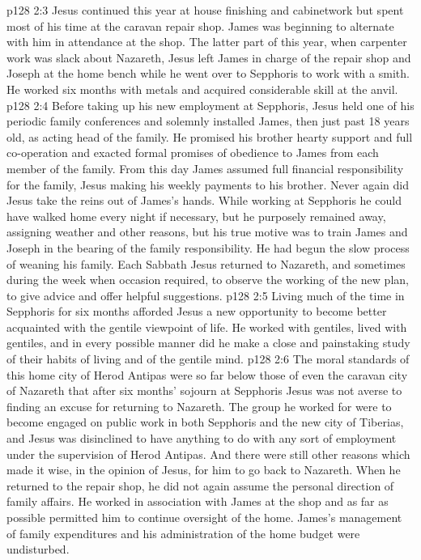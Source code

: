 \vs p128 2:3 Jesus continued this year at house finishing and cabinetwork but spent most of his time at the caravan repair shop. James was beginning to alternate with him in attendance at the shop. The latter part of this year, when carpenter work was slack about Nazareth, Jesus left James in charge of the repair shop and Joseph at the home bench while he went over to Sepphoris to work with a smith. He worked six months with metals and acquired considerable skill at the anvil.
\vs p128 2:4 \pc Before taking up his new employment at Sepphoris, Jesus held one of his periodic family conferences and solemnly installed James, then just past 18 years old, as acting head of the family. He promised his brother hearty support and full co\hyp{}operation and exacted formal promises of obedience to James from each member of the family. From this day James assumed full financial responsibility for the family, Jesus making his weekly payments to his brother. Never again did Jesus take the reins out of James’s hands. While working at Sepphoris he could have walked home every night if necessary, but he purposely remained away, assigning weather and other reasons, but his true motive was to train James and Joseph in the bearing of the family responsibility. He had begun the slow process of weaning his family. Each Sabbath Jesus returned to Nazareth, and sometimes during the week when occasion required, to observe the working of the new plan, to give advice and offer helpful suggestions.
\vs p128 2:5 \pc Living much of the time in Sepphoris for six months afforded Jesus a new opportunity to become better acquainted with the gentile viewpoint of life. He worked with gentiles, lived with gentiles, and in every possible manner did he make a close and painstaking study of their habits of living and of the gentile mind.
\vs p128 2:6 The moral standards of this home city of Herod Antipas were so far below those of even the caravan city of Nazareth that after six months’ sojourn at Sepphoris Jesus was not averse to finding an excuse for returning to Nazareth. The group he worked for were to become engaged on public work in both Sepphoris and the new city of Tiberias, and Jesus was disinclined to have anything to do with any sort of employment under the supervision of Herod Antipas. And there were still other reasons which made it wise, in the opinion of Jesus, for him to go back to Nazareth. When he returned to the repair shop, he did not again assume the personal direction of family affairs. He worked in association with James at the shop and as far as possible permitted him to continue oversight of the home. James’s management of family expenditures and his administration of the home budget were undisturbed.
